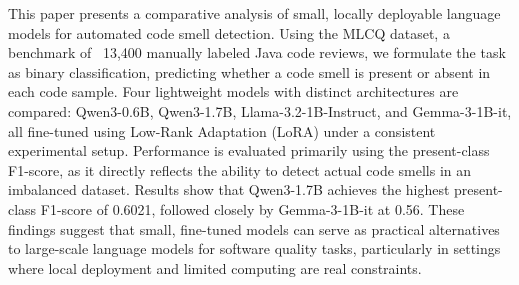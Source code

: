 This paper presents a comparative analysis of small, locally deployable language models for automated code smell detection. Using the MLCQ dataset, a benchmark of ~13,400 manually labeled Java code reviews, we formulate the task as binary classification, predicting whether a code smell is present or absent in each code sample. Four lightweight models with distinct architectures are compared: Qwen3-0.6B, Qwen3-1.7B, Llama-3.2-1B-Instruct, and Gemma-3-1B-it, all fine-tuned using Low-Rank Adaptation (LoRA) under a consistent experimental setup. Performance is evaluated primarily using the present-class F1-score, as it directly reflects the ability to detect actual code smells in an imbalanced dataset. Results show that Qwen3-1.7B achieves the highest present-class F1-score of 0.6021, followed closely by Gemma-3-1B-it at 0.56. These findings suggest that small, fine-tuned models can serve as practical alternatives to large-scale language models for software quality tasks, particularly in settings where local deployment and limited computing are real constraints.